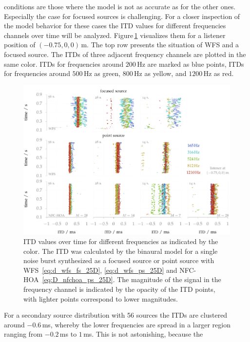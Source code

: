  conditions are those where the model is not
as accurate as for the other ones. Especially the case for focused sources is
challenging. For a closer inspection of the model behavior
for these cases the \ac{ITD} values for different frequencies
channels over time will be analyzed. Figure\,\ref{fig:itd_frequency_channels}
visualizes them for a listener position of $(-0.75,0,0)$\,m. The top row presents
the situation of \ac{WFS} and a focused source. The \acp{ITD} of three adjacent
frequency channels are plotted in the same color.
\acp{ITD} for frequencies
around $200$\,Hz are marked as blue points, \acp{ITD} for frequencies around
$500$\,Hz as green, $800$\,Hz as yellow, and $1200$\,Hz as red.
%
\begin{figure}
    \centering
    \includegraphics{fig6_04/fig6_04}
    \caption{\ac{ITD} values over time for different frequencies as indicated by the
    color. The \ac{ITD} was calculated by the binaural model for a single noise
    burst synthesized as a focused source or point source with
    \ac{WFS}~\protect\eqref{eq:d_wfs_fs_25D}, \protect\eqref{eq:d_wfs_ps_25D} and
    \ac{NFC-HOA}~\protect\eqref{eq:D_nfchoa_ps_25D}.
    The magnitude of the signal in the frequency channel is indicated by the
    opacity of the \ac{ITD} points, with lighter points correspond to
    lower magnitudes.
    }
    \label{fig:itd_frequency_channels}
\end{figure}
%
For a secondary source distribution with 56 sources the \acp{ITD} are clustered
around $-0.6$\,ms, whereby the lower frequencies are spread in a larger region
ranging from $-0.2$\,ms to $1$\,ms. This is not astonishing, because the
